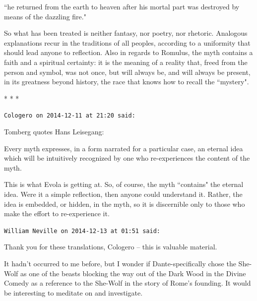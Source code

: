 ``he returned from the earth to heaven after his mortal part was destroyed by means of the dazzling fire."

So what has been treated is neither fantasy, nor poetry, nor rhetoric. Analogous explanations recur in the traditions of all peoples, according to a uniformity that should lead anyone to reflection. Also in regards to Romulus, the myth contains a faith and a spiritual certainty: it is the meaning of a reality that, freed from the person and symbol, was not once, but will always be, and will always be present, in its greatness beyond history, the race that knows how to recall the ``mystery".




\begin{center}* * *\end{center}

\begin{footnotesize}\begin{sffamily}



\texttt{Cologero on 2014-12-11 at 21:20 said: }

Tomberg quotes Hans Leisegang:

\begin{quotex}
Every myth expresses, in a form narrated for a particular case, an eternal idea which will be intuitively recognized by one who re-experiences the content of the myth. 

\end{quotex}
This is what Evola is getting at. So, of course, the myth ``contains" the eternal idea. Were it a simple reflection, then anyone could understand it. Rather, the idea is embedded, or hidden, in the myth, so it is discernible only to those who make the effort to re-experience it.


\hfill

\texttt{William Neville on 2014-12-13 at 01:51 said: }

Thank you for these translations, Cologero – this is valuable material.

It hadn't occurred to me before, but I wonder if Dante-specifically chose the She-Wolf as one of the beasts blocking the way out of the Dark Wood in the Divine Comedy as a reference to the She-Wolf in the story of Rome's founding. It would be interesting to meditate on and investigate.


\hfill


\hfill


\end{sffamily}\end{footnotesize}
